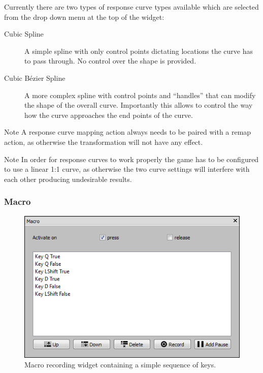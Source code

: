 \documentclass[a4, 10pt]{article}
\begin{document}
Currently there are two types of response curve types available which
are selected from the drop down menu at the top of the widget:
\begin{description}
    \item[Cubic Spline] A simple spline with only control points dictating
        locations the curve has to pass through. No control over the
        shape is provided.
    \item[Cubic B\'{e}zier Spline] A more complex spline with control
        points and ``handles'' that can modify the shape of the overall
        curve. Importantly this allows to control the way how the curve
        approaches the end points of the curve.
\end{description}

\begin{bclogo}[
    couleur=yellow!40,
    couleurBord=orange!80,
    couleurBarre=orange!80,
    arrondi=0.1,
    logo=\bcinfo
]{Note}
    A response curve mapping action always needs to be paired with a
    remap action, as otherwise the transformation will not have any
    effect.
\end{bclogo}

\vspace{1em}

\begin{bclogo}[
    couleur=yellow!40,
    couleurBord=orange!80,
    couleurBarre=orange!80,
    arrondi=0.1,
    logo=\bcinfo
]{Note}
    In order for response curves to work properly the game has to be
    configured to use a linear 1:1 curve, as otherwise the two curve
    settings will interfere with each other producing undesirable
    results.
\end{bclogo}


\subsubsection{Macro}

\begin{figure}[bt]
    \centering

    \includegraphics[width=0.75\linewidth]{images/action_macro}
    \caption{Macro recording widget containing a simple sequence of
    keys.}
    \label{fig:action_macro}
\end{figure}
\end{document}
